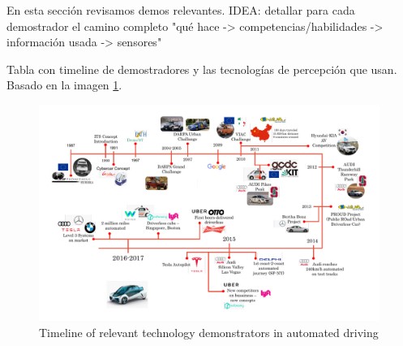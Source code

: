 
En esta sección revisamos demos relevantes.
IDEA: detallar para cada demostrador el camino completo "qué hace -> competencias/habilidades -> información usada -> sensores"

Tabla con timeline de demostradores y las tecnologías de percepción que usan.
Basado en la imagen \ref{fig:tech-demos}.


\begin{figure}[h]
    \centering
    \includegraphics[width=0.99\textwidth]{"img/AD_Timeline"}
    \caption{Timeline of relevant technology demonstrators in automated driving}
    \label{fig:tech-demos}
\end{figure}

